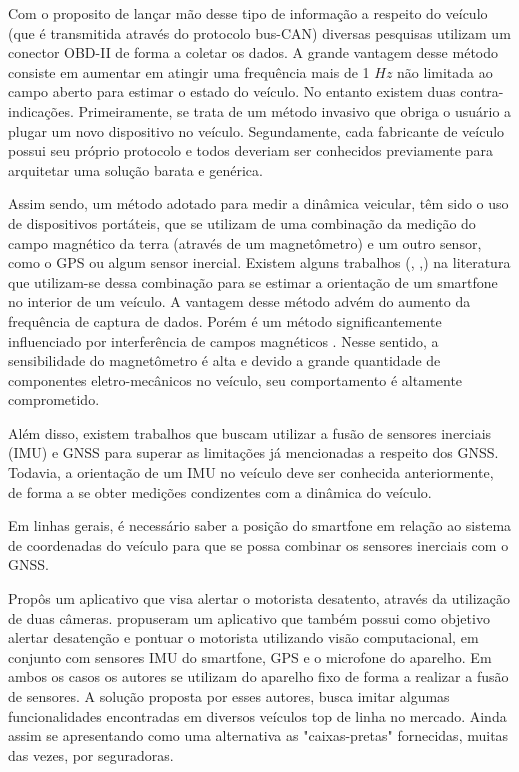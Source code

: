 Com o proposito de lançar mão desse tipo de informação a respeito do veículo (que é transmitida através do protocolo bus-CAN) diversas pesquisas utilizam um conector OBD-II de forma a coletar os dados. A grande vantagem desse método consiste em aumentar em atingir uma frequência mais de 1 $Hz$ não limitada ao campo aberto para estimar o estado do veículo. No entanto existem duas contra-indicações. Primeiramente, se trata de um método invasivo que obriga o usuário a plugar um novo dispositivo no veículo. Segundamente, cada fabricante de veículo possui seu próprio protocolo \cite{almazan2013full} e todos deveriam ser conhecidos previamente para arquitetar uma solução barata e genérica.

Assim sendo, um método adotado para medir a dinâmica veicular, têm sido o uso de dispositivos portáteis, que se utilizam de uma combinação da medição do campo magnético da terra (através de um magnetômetro) e um outro sensor, como o GPS ou algum sensor inercial.
Existem alguns trabalhos (\citep{zheng2016unsupervised}, \citep{zheng2015mobileutdrive},\citep{almazan2013full}) na literatura que utilizam-se dessa combinação para se estimar a orientação de um smartfone no interior de um veículo. A vantagem desse método advém do aumento da frequência de captura de dados. Porém é um método significantemente influenciado por interferência de campos magnéticos \cite{almazan2013full}. Nesse sentido, a sensibilidade do magnetômetro é alta e devido a grande quantidade de componentes eletro-mecânicos no veículo, seu comportamento é altamente comprometido. 

Além disso, existem trabalhos que buscam utilizar a fusão de sensores inerciais (IMU) e GNSS para superar as limitações já mencionadas a respeito dos GNSS. Todavia, a orientação de um IMU no veículo deve ser conhecida anteriormente, de forma a se obter medições condizentes com a dinâmica do veículo.

Em linhas gerais, é necessário saber a posição do smartfone em relação ao sistema de coordenadas do veículo para que se possa combinar os sensores inerciais com o GNSS.

\citet{you2013carsafe} Propôs um aplicativo que visa alertar o motorista desatento, através da utilização de duas câmeras. \citeauthor*{bergasa2014drivesafe}\citep{bergasa2014drivesafe} propuseram um aplicativo que também possui como objetivo alertar desatenção e pontuar o motorista utilizando visão computacional, em conjunto com sensores IMU do smartfone, GPS e o microfone do aparelho. Em ambos os casos os autores se utilizam do aparelho fixo de forma a realizar a fusão de sensores. A solução proposta por esses autores, busca imitar algumas funcionalidades encontradas em diversos veículos top de linha no mercado. Ainda assim se apresentando como uma alternativa as "caixas-pretas" fornecidas, muitas das vezes, por seguradoras.

